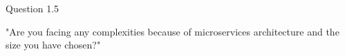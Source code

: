 \begin{shaded} Question 1.5 \end{shaded} \label{question:hybris_architecture/interview/question_1.5}
"Are you facing any complexities because of microservices architecture and the size you have chosen?"\\
